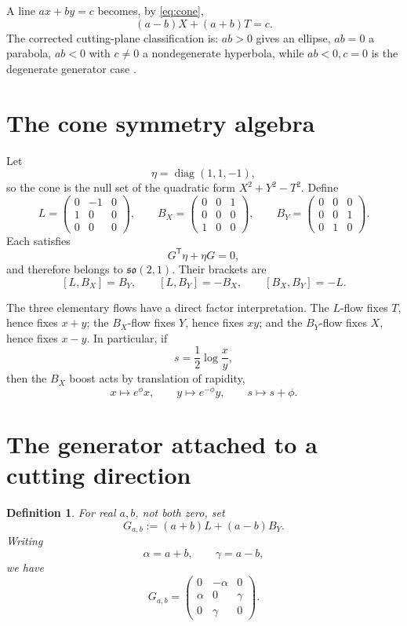 \documentclass[11pt]{amsart}
\newtheorem{definition}[theorem]{Definition}
\theoremstyle{remark}
\begin{document}
A line $ax+by=c$ becomes, by \eqref{eq:cone},
\begin{equation}\label{eq:plane}
(a-b)X+(a+b)T=c.
\end{equation}
The corrected cutting-plane classification is: $ab>0$ gives an ellipse, $ab=0$ a parabola, $ab<0$ with $c\ne0$ a nondegenerate hyperbola, while $ab<0,c=0$ is the degenerate generator case \cite{Ebert2026Table}.

\section{The cone symmetry algebra}

Let
\[
\eta=\operatorname{diag}(1,1,-1),
\]
so the cone is the null set of the quadratic form $X^2+Y^2-T^2$.  Define
\[
L=\begin{pmatrix}
0&-1&0\\
1&0&0\\
0&0&0
\end{pmatrix},
\qquad
B_X=\begin{pmatrix}
0&0&1\\
0&0&0\\
1&0&0
\end{pmatrix},
\qquad
B_Y=\begin{pmatrix}
0&0&0\\
0&0&1\\
0&1&0
\end{pmatrix}.
\]
Each satisfies
\[
G^{\mathsf T}\eta+\eta G=0,
\]
and therefore belongs to $\mathfrak{so}(2,1)$.  Their brackets are
\[
[L,B_X]=B_Y,
\qquad
[L,B_Y]=-B_X,
\qquad
[B_X,B_Y]=-L.
\]

The three elementary flows have a direct factor interpretation.  The $L$-flow fixes $T$, hence fixes $x+y$; the $B_X$-flow fixes $Y$, hence fixes $xy$; and the $B_Y$-flow fixes $X$, hence fixes $x-y$.  In particular, if
\[
s=\frac12\log\frac{x}{y},
\]
then the $B_X$ boost acts by translation of rapidity,
\[
x\mapsto e^\phi x,
\qquad
y\mapsto e^{-\phi}y,
\qquad
s\mapsto s+\phi.
\]

\section{The generator attached to a cutting direction}

\begin{definition}
For real $a,b$, not both zero, set
\begin{equation}\label{eq:G}
G_{a,b}:=(a+b)L+(a-b)B_Y.
\end{equation}
Writing
\[
\alpha=a+b,
\qquad
\gamma=a-b,
\]
we have
\[
G_{a,b}
=\begin{pmatrix}
0&-\alpha&0\\
\alpha&0&\gamma\\
0&\gamma&0
\end{pmatrix}.
\]
\end{definition}
\end{document}

